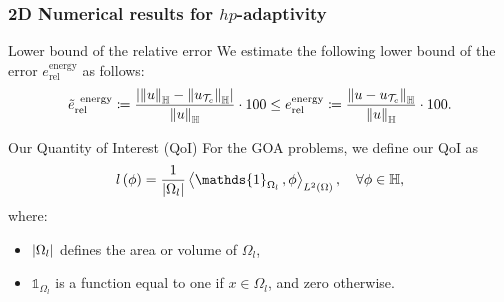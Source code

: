 \begin{frame}
  \frametitle{2D Numerical results for \( hp \)-adaptivity}

  \begin{block}{Lower bound of the relative error}
    We estimate the following lower bound of the error \( e_{\textrm{rel}}^{\textrm{energy}} \) as follows:
    \begin{equation}
      \tilde{e}_{\textrm{rel}}^{\textrm{\, energy}} \coloneqq 
      \frac{\left|\left\|u\right\|_{\mathbb{H}} - \left\|u_{\mathcal{T}_{c}}\right\|_{\mathbb{H}}\right|}{\left\|u\right\|_{\mathbb{H}}} \cdot 100 
      \leq e_{\textrm{rel}}^{\textrm{energy}} \coloneqq  
      \frac{\left\|u - u_{\mathcal{T}_{c}}\right\|_{\mathbb{H}}}{\left\|u\right\|_{\mathbb{H}}} \cdot 100.
    \end{equation}
  \end{block}
  
  \begin{block}{Our Quantity of Interest (QoI)}
    For the GOA problems, we define our QoI as
    \begin{equation}
      l\left(\phi\right) = 
      \frac{1}{\abs{\Omega_{l}}} \scalaire{\mathds{1}_{\Omega_{l}}}{\phi}_{L^2(\Omega)}, 
      \quad \forall \phi \in \H,
    \end{equation}
    where:
    \begin{itemize}
      \item \( \left|\Omega_{l}\right| \) defines the area or volume of \( \Omega_{l} \),
      \item \( \mathds{1}_{\Omega_{l}} \) is a function equal to one if \( x \in \Omega_{l} \), and zero otherwise.
    \end{itemize}
  \end{block}

\end{frame}

